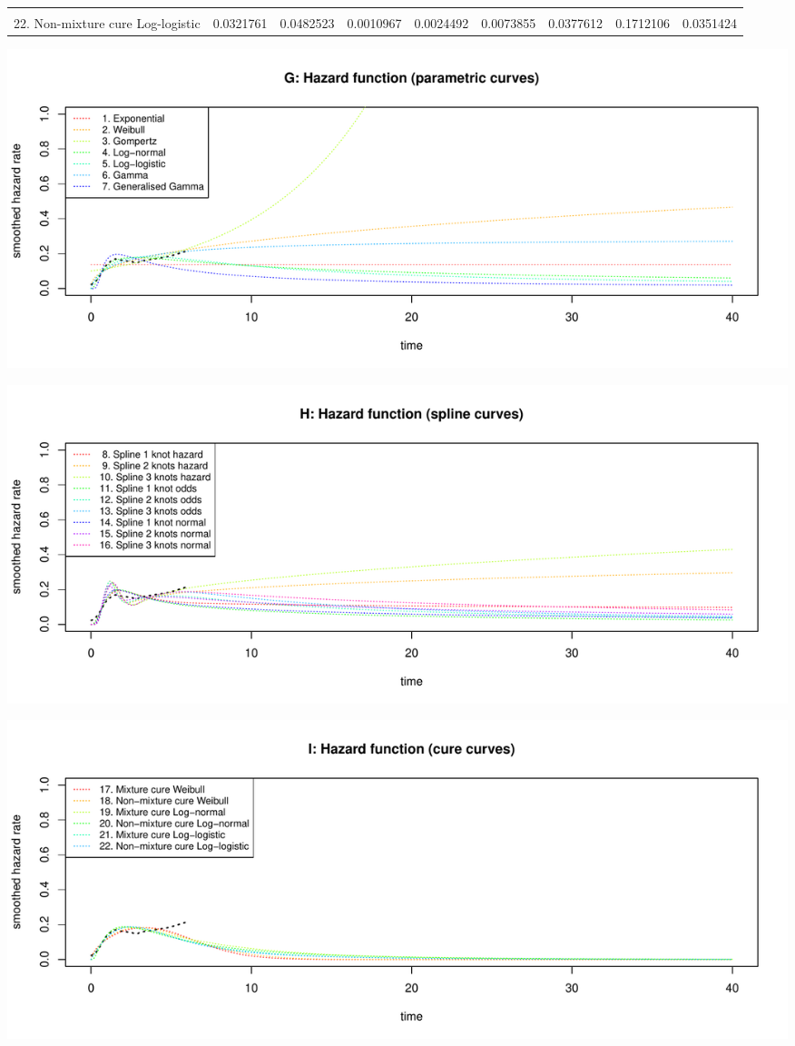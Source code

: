 \documentclass[
]{article}
\begin{document}
\begin{table}
{\begin{tabular}[t]{lrrrrrrrr}
\cellcolor{gray!6}{21. Mixture cure Log-logistic} & \cellcolor{gray!6}{0.0336695} & \cellcolor{gray!6}{0.0485634} & \cellcolor{gray!6}{0.0012991} & \cellcolor{gray!6}{0.0028998} & \cellcolor{gray!6}{0.0085638} & \cellcolor{gray!6}{0.0419015} & \cellcolor{gray!6}{0.1712400} & \cellcolor{gray!6}{0.0388233}\\
22. Non-mixture cure Log-logistic & 0.0321761 & 0.0482523 & 0.0010967 & 0.0024492 & 0.0073855 & 0.0377612 & 0.1712106 & 0.0351424\\
\bottomrule
\end{tabular}}
\end{table}

\begin{flushleft}\includegraphics[height=0.29\textheight]{Images/validate_extrapolation2-7} \end{flushleft}

\begin{flushleft}\includegraphics[height=0.29\textheight]{Images/validate_extrapolation2-8} \end{flushleft}

\begin{flushleft}\includegraphics[height=0.29\textheight]{Images/validate_extrapolation2-9} \end{flushleft}
\end{document}
